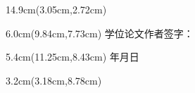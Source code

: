 \clearpage
\thispagestyle{frontmatterstyle}
\label{page:originality}
\null

\begin{textblock*}{14.9cm}(3.05cm,2.72cm)
    {\kaishu\fontsize{12pt}{20pt}\selectfont
    \setlength{\parindent}{2em}
    \JOUOriginalityStatementBody
    }
\end{textblock*}

\begin{textblock*}{6.0cm}(9.84cm,7.73cm)
    {\songti{}学位论文作者签字：}
\end{textblock*}

\begin{textblock*}{5.4cm}(11.25cm,8.43cm)
    {\songti{}年\hspace{1.5cm}月\hspace{1.5cm}日}
\end{textblock*}

\begin{textblock*}{3.2cm}(3.18cm,8.78cm)
    {\JOUDownloadHintLineOne\par \JOUDownloadHintLineTwo}
\end{textblock*}

\vfill\null
